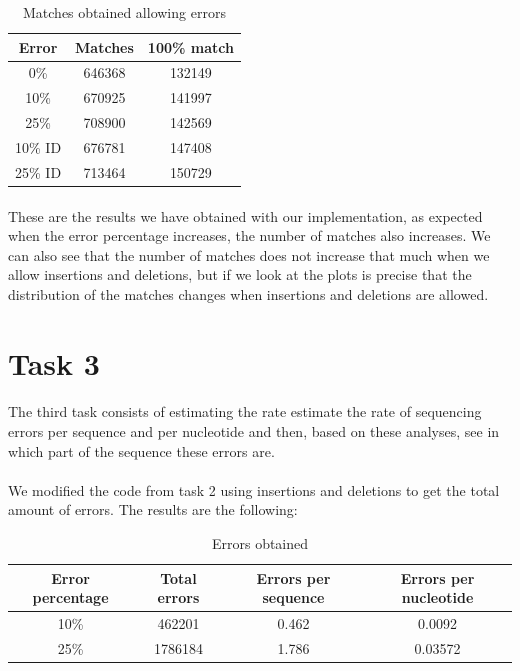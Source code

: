 \documentclass[a4paper,10pt]{article}
\begin{document}
\begin{table}[H]
    \centering
    \begin{tabular}{| c | c | c |}
        \hline
        Error & Matches & 100\% match \\
        \hline
        \hline
        0\% & 646368 & 132149 \\
        10\% & 670925 & 141997 \\
        25\% & 708900 & 142569 \\
        10\% ID & 676781 & 147408 \\
        25\% ID & 713464 & 150729 \\
        \hline
    \end{tabular}
    \caption{Matches obtained allowing errors}
    \label{table:results2}
\end{table}

\paragraph{} These are the results we have obtained with our implementation, as expected when the error percentage increases, the number of matches also increases. We can also see that the number of matches does not increase that much when we allow insertions and deletions, but if we look at the plots is precise that the distribution of the matches changes when insertions and deletions are allowed.

\newpage

\section{Task 3}

\paragraph{} The third task consists of estimating the rate estimate the rate of sequencing errors per sequence and per nucleotide and then, based on these analyses, see in which part of the sequence these errors are.

\paragraph{} We modified the code from task 2 using insertions and deletions to get the total amount of errors. The results are the following:

\begin{table}[H]
    \centering
    \begin{tabular}{| c | c | c | c |}
        \hline
        Error percentage & Total errors & Errors per sequence & Errors per nucleotide \\
        \hline
        \hline
        10\% & 462201 & 0.462 & 0.0092 \\
        25\% & 1786184 & 1.786 & 0.03572 \\
        \hline
    \end{tabular}
    \caption{Errors obtained}
    \label{table:results2}
\end{table}
\end{document}
